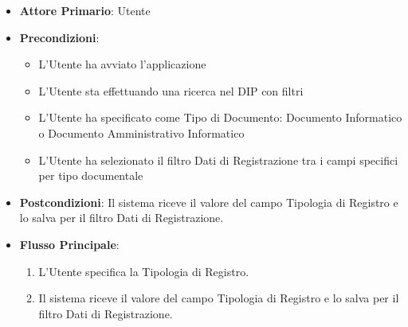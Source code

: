 \label{compilaValoreFiltroTipologiaDiRegistro}
\begin{itemize}
      \item \textbf{Attore Primario}: Utente
      \item \textbf{Precondizioni}: 
      \begin{itemize}            
            \item L'Utente ha avviato l'applicazione
            \item L'Utente sta effettuando una ricerca nel DIP con filtri
            \item L'Utente ha specificato come Tipo di Documento: Documento Informatico o Documento Amministrativo Informatico
            \item L'Utente ha selezionato il filtro Dati di Registrazione tra i campi specifici per tipo documentale
      \end{itemize}
      \item \textbf{Postcondizioni}: Il sistema riceve il valore del campo Tipologia di Registro e lo salva per il filtro Dati di Registrazione.
      \item \textbf{Flusso Principale}:
      \begin{enumerate}
            \item L'Utente specifica la Tipologia di Registro.
            \item Il sistema riceve il valore del campo Tipologia di Registro e lo salva per il filtro Dati di Registrazione.
      \end{enumerate}
\end{itemize}

